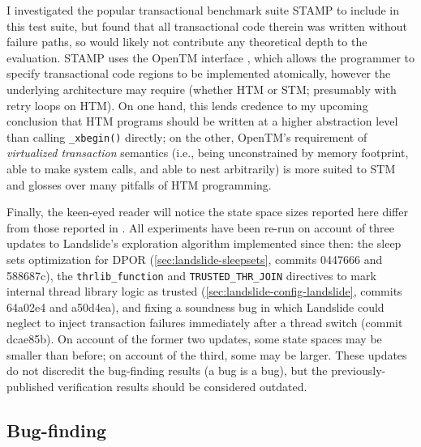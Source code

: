 I investigated the popular transactional benchmark suite STAMP \cite{stamp}
to include in this test suite,
but found that all transactional code therein was written without failure paths,
so would likely not contribute any theoretical depth to the evaluation.
STAMP uses the OpenTM interface \cite{opentm},
which allows the programmer to specify transactional code regions to be implemented atomically,
however the underlying architecture may require
(whether HTM or STM; presumably with retry loops on HTM).
On one hand,
this lends credence to my upcoming conclusion
that HTM programs should be written at a higher abstraction level than calling {\tt \_xbegin()} directly;
on the other,
OpenTM's requirement of {\em virtualized transaction} semantics
(i.e., being unconstrained by memory footprint, able to make system calls, and able to nest arbitrarily)
is more suited to STM and glosses over many pitfalls of HTM programming.

Finally, the keen-eyed reader will notice the state space sizes reported here
differ from those reported in \cite{sigbovik-htm}.
All experiments have been re-run
on account of three updates to Landslide's exploration algorithm
implemented since then:
the sleep sets optimization for DPOR (\cref{sec:landslide-sleepsets}, commits 0447666 and 588687c),
the {\tt thrlib\_function} and {\tt TRUSTED\_THR\_JOIN} directives
to mark internal thread library logic as trusted
(\cref{sec:landslide-config-landslide}, commits 64a02e4 and a50d4ea),
and fixing a soundness bug in which Landslide could neglect to inject transaction failures
immediately after a thread switch (commit dcae85b).
On account of the former two updates, some state spaces may be smaller than before;
on account of the third, some may be larger.
These updates do not discredit the bug-finding results (a bug is a bug),
but the previously-published verification results should be considered outdated.

\newcommand\ETA[1]{\hilight{brownish}{{\em #1}}\xspace}
\newcommand\cpu[1]{\hilight{darkcyan}{{#1}}\xspace}
\newcommand\wtm[1]{\hilight{lime}{{#1}}\xspace}
\newcommand\ints[1]{\hilight{pinkish}{{#1}}\xspace}
\newcommand\ETAdag[1]{\ETA{\ensuremath{\dagger}#1}}

\subsection{Bug-finding}
\label{sec:tm-eval-bugs}


